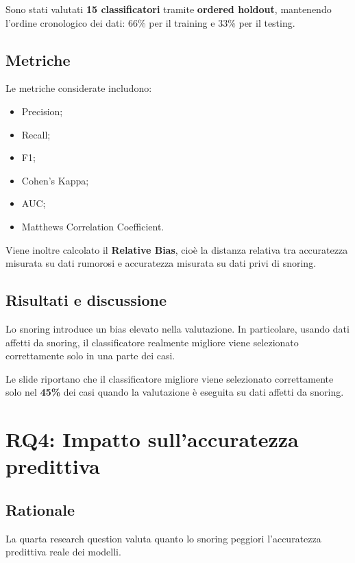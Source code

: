 Sono stati valutati \textbf{15 classificatori} tramite \textbf{ordered holdout}, mantenendo l'ordine cronologico dei dati: 66\% per il training e 33\% per il testing.

\subsection{Metriche}

Le metriche considerate includono:

\begin{itemize}
    \item Precision;
    \item Recall;
    \item F1;
    \item Cohen's Kappa;
    \item AUC;
    \item Matthews Correlation Coefficient.
\end{itemize}

Viene inoltre calcolato il \textbf{Relative Bias}, cioè la distanza relativa tra accuratezza misurata su dati rumorosi e accuratezza misurata su dati privi di snoring.

\subsection{Risultati e discussione}

Lo snoring introduce un bias elevato nella valutazione. In particolare, usando dati affetti da snoring, il classificatore realmente migliore viene selezionato correttamente solo in una parte dei casi.

\begin{notaslide}
Le slide riportano che il classificatore migliore viene selezionato correttamente solo nel \textbf{45\%} dei casi quando la valutazione è eseguita su dati affetti da snoring.
\end{notaslide}

\section{RQ4: Impatto sull'accuratezza predittiva}

\subsection{Rationale}

La quarta research question valuta quanto lo snoring peggiori l'accuratezza predittiva reale dei modelli.

